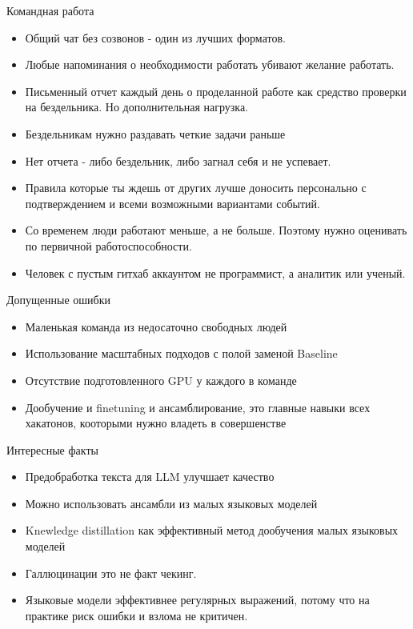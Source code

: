 \documentclass[presentation]{beamer}
\begin{document}
\begin{frame}[label={sec:orgc4e07d4}]{Командная работа}
\begin{itemize}
\item Общий чат без созвонов - один из лучших форматов.
\item Любые напоминания о необходимости работать убивают желание работать.
\item Письменный отчет каждый день о проделанной работе как средство проверки на бездельника. Но дополнительная нагрузка.
\item Бездельникам нужно раздавать четкие задачи раньше
\item Нет отчета - либо бездельник, либо загнал себя и не успевает.
\item Правила которые ты ждешь от других лучше доносить персонально с подтверждением и всеми возможными вариантами событий.
\item Со временем люди работают меньше, а не больше. Поэтому нужно оценивать по первичной работоспособности.
\item Человек с пустым гитхаб аккаунтом не программист, а аналитик или ученый.
\end{itemize}
\end{frame}

\begin{frame}[label={sec:org9e03a10}]{Допущенные ошибки}
\begin{itemize}
\item Маленькая команда из недосаточно свободных людей
\item Использование масштабных подходов с полой заменой Baseline
\item Отсутствие подготовленного GPU у каждого в команде
\item Дообучение и finetuning и ансамблирование, это главные навыки всех хакатонов, кооторыми нужно владеть в совершенстве
\end{itemize}
\end{frame}


\begin{frame}[label={sec:org08dab5c}]{Интересные факты}
\begin{itemize}
\item Предобработка текста для LLM улучшает качество
\item Можно использовать ансамбли из малых языковых моделей
\item Knewledge distillation как эффективный метод дообучения малых языковых моделей
\item Галлюцинации это не факт чекинг.
\item Языковые модели эффективнее регулярных выражений, потому что на практике риск ошибки и взлома не критичен.
\end{itemize}
\end{frame}
\end{document}
